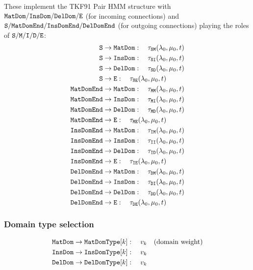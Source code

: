 These implement the TKF91 Pair HMM structure with $\mathtt{MatDom}/\mathtt{InsDom}/\mathtt{DelDom}/{\tt E}$ (for incoming connections) and ${\tt S}/\mathtt{MatDomEnd}/\mathtt{InsDomEnd}/\mathtt{DelDomEnd}$ (for outgoing connections)
playing the roles of ${\tt S}/{\tt M}/{\tt I}/{\tt D}/{\tt E}$:
\begin{align}
{\tt S} &\to \mathtt{MatDom}: \quad \tau_{{\tt S}{\tt M}}(\lambda_0,\mu_0,t) \\
{\tt S} &\to \mathtt{InsDom}: \quad \tau_{{\tt S}{\tt I}}(\lambda_0,\mu_0,t) \\
{\tt S} &\to \mathtt{DelDom}: \quad \tau_{{\tt S}{\tt D}}(\lambda_0,\mu_0,t) \\
{\tt S} &\to {\tt E}: \quad \tau_{{\tt S}{\tt E}}(\lambda_0,\mu_0,t) \\
\mathtt{MatDomEnd} &\to \mathtt{MatDom}: \quad \tau_{{\tt M}{\tt M}}(\lambda_0,\mu_0,t) \\
\mathtt{MatDomEnd} &\to \mathtt{InsDom}: \quad \tau_{{\tt M}{\tt I}}(\lambda_0,\mu_0,t) \\
\mathtt{MatDomEnd} &\to \mathtt{DelDom}: \quad \tau_{{\tt M}{\tt D}}(\lambda_0,\mu_0,t) \\
\mathtt{MatDomEnd} &\to {\tt E}: \quad \tau_{{\tt M}{\tt E}}(\lambda_0,\mu_0,t) \\
\mathtt{InsDomEnd} &\to \mathtt{MatDom}: \quad \tau_{{\tt I}{\tt M}}(\lambda_0,\mu_0,t) \\
\mathtt{InsDomEnd} &\to \mathtt{InsDom}: \quad \tau_{{\tt I}{\tt I}}(\lambda_0,\mu_0,t) \\
\mathtt{InsDomEnd} &\to \mathtt{DelDom}: \quad \tau_{{\tt I}{\tt D}}(\lambda_0,\mu_0,t) \\
\mathtt{InsDomEnd} &\to {\tt E}: \quad \tau_{{\tt I}{\tt E}}(\lambda_0,\mu_0,t) \\
\mathtt{DelDomEnd} &\to \mathtt{MatDom}: \quad \tau_{{\tt D}{\tt M}}(\lambda_0,\mu_0,t) \\
\mathtt{DelDomEnd} &\to \mathtt{InsDom}: \quad \tau_{{\tt D}{\tt I}}(\lambda_0,\mu_0,t) \\
\mathtt{DelDomEnd} &\to \mathtt{DelDom}: \quad \tau_{{\tt D}{\tt D}}(\lambda_0,\mu_0,t) \\
\mathtt{DelDomEnd} &\to {\tt E}: \quad \tau_{{\tt D}{\tt E}}(\lambda_0,\mu_0,t)
\end{align}

\subsubsection{Domain type selection}

\begin{align}
\mathtt{MatDom} &\to \mathtt{MatDomType}[k]: \quad v_k \quad\text{(domain weight)} \\
\mathtt{InsDom} &\to \mathtt{InsDomType}[k]: \quad v_k \\
\mathtt{DelDom} &\to \mathtt{DelDomType}[k]: \quad v_k
\end{align}

